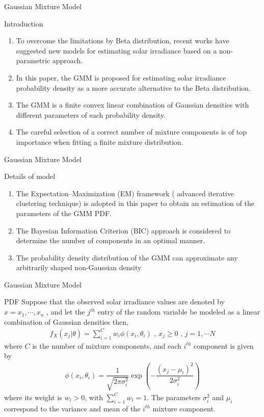 \documentclass{beamer}
\providecommand{\brak}[1]{\ensuremath{\left(#1\right)}}
\begin{document}
\begin{frame}{Gaussian Mixture Model}
\begin{block}{Introduction}
\begin{enumerate}
    \item  To overcome the limitations by Beta distribution, recent works have suggested
new models for estimating solar irradiance based on a non-parametric approach.
   \item In this paper, the GMM is proposed for estimating solar irradiance probability density as
a more accurate alternative to the Beta distribution.
\item The GMM is a finite convex linear combination of Gaussian densities with different parameters of each probability density. 
\item  The careful selection of a correct number of mixture components is of top importance when fitting a finite mixture distribution. 
\end{enumerate}
\end{block}
\end{frame}
\begin{frame}{Gaussian Mixture Model}
    \begin{block}{Details of model}
    \begin{enumerate}
        \item The Expectation–Maximization (EM) framework ( advanced iterative clustering technique) 
        is adopted in this paper to obtain an estimation of the parameters of the GMM PDF.
        \item The Bayesian Information Criterion (BIC) approach is considered to determine the number
of components in an optimal manner.
\item The probability density distribution of the GMM can approximate any arbitrarily shaped non-Gaussian density
    \end{enumerate}
    \end{block}
\end{frame} 
\begin{frame}{Gaussian Mixture Model}
    \begin{block}{PDF}
    Suppose that the observed solar irradiance values are denoted by $x = x_1, \cdots ,x_n $ , and let the $j^{th}$ entry of the random variable be modeled as a linear combination of Gaussian densities then,
\begin{align}
f_X(x_j | \theta) = \sum_{i=1}^{C}w_i \phi(x_i, \theta_i) \text{ , } x_j \ge 0 \text{ , } j=1, \cdots N
\end{align}
where $C$ is the number of mixture components, and each $i^{th}$ component is given by
\begin{align}
    \phi(x_i, \theta_i) = \dfrac{1}{\sqrt{2\pi\sigma_i^2}}\exp{\brak{- \dfrac{(x_j- \mu_i)^2}{2\sigma_i^2}}}
\end{align}
where its weight is $w_i > 0$, with $\sum_{i=1}^{C}w_i =1$. The parameters $ \sigma_i^2$ and $ \mu _i$ correspond to the variance and mean of the $ i^{th}$ mixture component.
    \end{block}
\end{frame}
\end{document}
